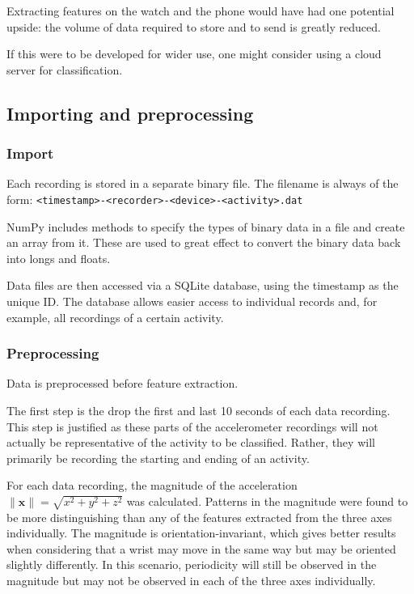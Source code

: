     Extracting features on the watch and the phone would have had one potential upside: the volume of data required to store and to send is greatly reduced. 
    
    If this were to be developed for wider use, one might consider using a cloud server for classification.
  
    \subsection{Importing and preprocessing}
      \label{sec:importing-and-preprocessing}
      \subsubsection{Import}
        Each recording is stored in a separate binary file. The filename is always of the form: \texttt{<timestamp>-<recorder>-<device>-<activity>.dat}
        
        NumPy includes methods to specify the types of binary data in a file and create an array from it. These are used to great effect to convert the binary data back into longs and floats.
        
        Data files are then accessed via a SQLite database, using the timestamp as the unique ID. The database allows easier access to individual records and, for example, all recordings of a certain activity.
      \subsubsection{Preprocessing}
        \label{sec:preprocessing}
        Data is preprocessed before feature extraction.
        
        The first step is the drop the first and last 10 seconds of each data recording. This step is justified as these parts of the accelerometer recordings will not actually be representative of the activity to be classified. Rather, they will primarily be recording the starting and ending of an activity.
        
        For each data recording, the magnitude of the acceleration $\|\mathbf{x}\| = \sqrt{x^2+y^2+z^2}$ was calculated. Patterns in the magnitude were found to be more distinguishing than any of the features extracted from the three axes individually. The magnitude is orientation-invariant, which gives better results when considering that a wrist may move in the same way but may be oriented slightly differently. In this scenario, periodicity will still be observed in the magnitude but may not be observed in each of the three axes individually.
        

